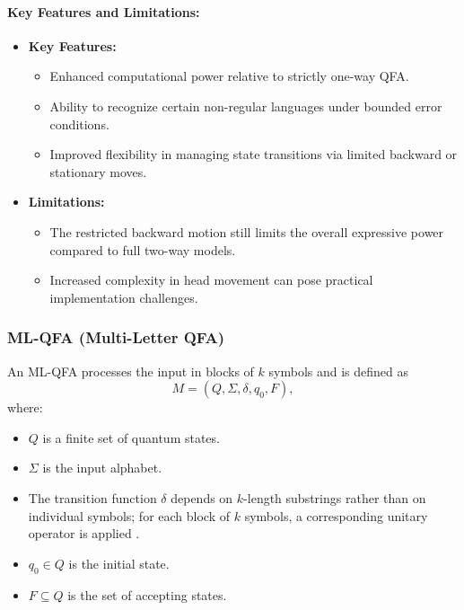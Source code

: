 \paragraph{Key Features and Limitations:}
\begin{itemize}
    \item \textbf{Key Features:}
    \begin{itemize}
        \item Enhanced computational power relative to strictly one-way QFA.
        \item Ability to recognize certain non-regular languages under bounded error conditions.
        \item Improved flexibility in managing state transitions via limited backward or stationary moves.
    \end{itemize}
    \item \textbf{Limitations:}
    \begin{itemize}
        \item The restricted backward motion still limits the overall expressive power compared to full two-way models.
        \item Increased complexity in head movement can pose practical implementation challenges.
    \end{itemize}
\end{itemize}

\subsubsection{ML-QFA (Multi-Letter QFA)}
\label{sssec:ml-qfa}
\begin{definition}[ML-QFA]
An ML-QFA processes the input in blocks of \( k \) symbols and is defined as 
\[
M = (Q, \Sigma, \delta, q_0, F),
\]
where:
\begin{itemize}
    \item \( Q \) is a finite set of quantum states.
    \item \( \Sigma \) is the input alphabet.
    \item The transition function \(\delta\) depends on \( k \)-length substrings rather than on individual symbols; for each block of \( k \) symbols, a corresponding unitary operator is applied \cite{belovs2007multi}.
    \item \( q_0 \in Q \) is the initial state.
    \item \( F \subseteq Q \) is the set of accepting states.
\end{itemize}
\end{definition}

